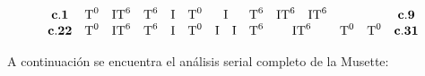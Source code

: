 		\[\begin{array}{*{12}c}
			\mathbf{c}.\mathbf{1}&\text{T}^0&\text{IT}^6&\text{T}^6&\text{I}&\text{T}^0&\text{I}&\text{T}^6&
				\begin{matrix}\text{IT}^6&\text{IT}^6\\
				\end{matrix}
			&&&\mathbf{c}.\mathbf{9}\\
			\mathbf{c}.\mathbf{22}&\text{T}^0&\text{IT}^6&\text{T}^6&\text{I}&\text{T}^0&
				\begin{matrix}
				\text{I}&\text{I}\\
				\end{matrix}
			&\text{T}^6&\text{IT}^6&\text{T}^0&\text{T}^0&\mathbf{c}.\mathbf{31}\\\end{array}\]
		
		A continuaci\'on
		se encuentra el an\'alisis serial completo de la Musette:
		